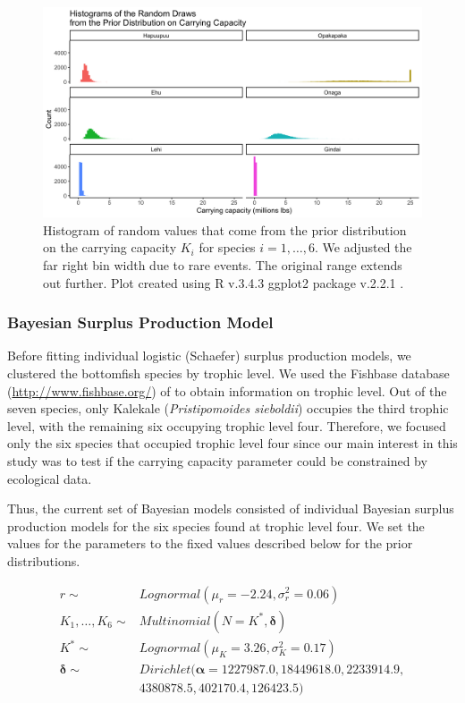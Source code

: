 \documentclass[oneside,12pt,final]{sty/ucthesis-CA2012}
\let\cite\citep                             %
\begin{document}
\begin{mainmatter}
\begin{figure}[H]
     \centering
       \includegraphics[width=.9\textwidth]{fig/hist_prior_K}
    \caption{Histogram of random values that come from the prior distribution on the carrying capacity $K_i$ for species $i=1,\dots,6$. We adjusted the far right bin width due to rare events. The original range extends out further. Plot created using R v.3.4.3 \cite{Rcite} ggplot2 package v.2.2.1 \cite{ggplot}.}
    \label{priorK}
\end{figure}

\subsubsection{Bayesian Surplus Production Model}
Before fitting individual logistic (Schaefer) surplus production models, we clustered the bottomfish species by trophic level. We used the Fishbase database (\url{http://www.fishbase.org/}) of \citet{fishbase} to obtain information on trophic level. Out of the seven species, only Kalekale (\textit{Pristipomoides sieboldii}) occupies the third trophic level, with the remaining six occupying trophic level four. Therefore, we focused only the six species that occupied trophic level four since our main interest in this study was to test if the carrying capacity parameter could be constrained by ecological data. 

\vspace{5mm}

Thus, the current set of Bayesian models consisted of individual Bayesian surplus production models for the six species found at trophic level four. We set the values for the parameters to the fixed values described below for the prior distributions.

\begin{align*}
r \sim & Lognormal(\mu_r = -2.24, \sigma_r^2 = 0.06) \\
K_1,\dots,K_6  \sim & Multinomial(N=K^*, \boldsymbol{\delta}) \\
K^*  \sim & Lognormal(\mu_K = 3.26, \sigma_K^2 = 0.17)  \\
\boldsymbol{\delta}  \sim & Dirichlet(\boldsymbol{\alpha}=1227987.0, 18449618.0, 2233914.9, \\
& 4380878.5, 402170.4, 126423.5)
\end{align*}




\end{mainmatter}
\end{document}
